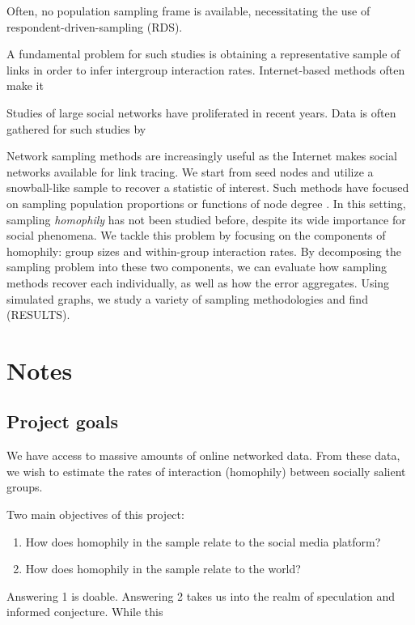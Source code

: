 \documentclass[a4paper]{article}
\begin{document}
Often, no population sampling frame is available, necessitating the use of respondent-driven-sampling (RDS).


A fundamental problem for such studies is obtaining a representative sample of links in order to infer intergroup interaction rates. Internet-based methods often make it

Studies of large social networks have proliferated in recent years. Data is often gathered for such studies by

Network sampling methods are increasingly useful as the Internet makes social networks available for link tracing. We start from seed nodes and utilize a snowball-like sample to recover a statistic of interest. Such methods have focused on sampling population proportions \cite{heckathorn_respondent-driven_2002} or functions of node degree \cite{karimi_visibility_2017}. In this setting, sampling \emph{homophily} \cite{currarini_economic_2009} has not been studied before, despite its wide importance for social phenomena. We tackle this problem by focusing on the components of homophily: group sizes and within-group interaction rates. By decomposing the sampling problem into these two components, we can evaluate how sampling methods recover each individually, as well as how the error aggregates. Using simulated graphs, we study a variety of sampling methodologies and find (RESULTS).

\section{Notes}

\subsection{Project goals}

We have access to massive amounts of online networked data. From these data, we wish to estimate the rates of interaction (homophily) between socially salient groups.

Two main objectives of this project:

\begin{enumerate}
\item How does homophily in the sample relate to the social media platform?
\item How does homophily in the sample relate to the world?
\end{enumerate}

Answering 1 is doable. Answering 2 takes us into the realm of speculation and informed conjecture. While this
\end{document}
